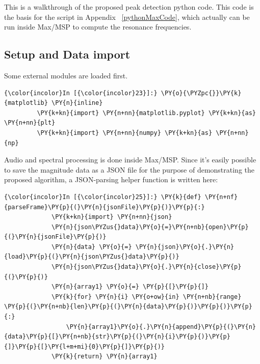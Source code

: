                 
    This is a walkthrough of the proposed peak detection python code. This code is the basis for the script in Appendix ~\ref{pythonMaxCode}, which actually can be run inside Max/MSP to compute the resonance
frequencies.


 \subsection{Setup and Data import}
\label{subsec:setup}
Some external modules are loaded first.

    \begin{Verbatim}[commandchars=\\\{\}]
{\color{incolor}In [{\color{incolor}23}]:} \PY{o}{\PYZpc{}}\PY{k}{matplotlib} \PY{n}{inline}
         \PY{k+kn}{import} \PY{n+nn}{matplotlib.pyplot} \PY{k+kn}{as} \PY{n+nn}{plt}
         \PY{k+kn}{import} \PY{n+nn}{numpy} \PY{k+kn}{as} \PY{n+nn}{np}
\end{Verbatim}




    Audio and spectral processing is done inside Max/MSP. Since it's easily
possible to save the magnitude data as a JSON file for the purpose of
demonstrating the proposed algorithm, a JSON-parsing helper function is
written here:

    \begin{Verbatim}[commandchars=\\\{\}]
{\color{incolor}In [{\color{incolor}25}]:} \PY{k}{def} \PY{n+nf}{parseFrame}\PY{p}{(}\PY{n}{jsonFile}\PY{p}{)}\PY{p}{:}
             \PY{k+kn}{import} \PY{n+nn}{json}
             \PY{n}{json\PYZus{}data}\PY{o}{=}\PY{n+nb}{open}\PY{p}{(}\PY{n}{jsonFile}\PY{p}{)}
             \PY{n}{data} \PY{o}{=} \PY{n}{json}\PY{o}{.}\PY{n}{load}\PY{p}{(}\PY{n}{json\PYZus{}data}\PY{p}{)}
             \PY{n}{json\PYZus{}data}\PY{o}{.}\PY{n}{close}\PY{p}{(}\PY{p}{)}
             \PY{n}{array1} \PY{o}{=} \PY{p}{[}\PY{p}{]}
             \PY{k}{for} \PY{n}{i} \PY{o+ow}{in} \PY{n+nb}{range} \PY{p}{(}\PY{n+nb}{len}\PY{p}{(}\PY{n}{data}\PY{p}{)}\PY{p}{)}\PY{p}{:}
                 \PY{n}{array1}\PY{o}{.}\PY{n}{append}\PY{p}{(}\PY{n}{data}\PY{p}{[}\PY{n+nb}{str}\PY{p}{(}\PY{n}{i}\PY{p}{)}\PY{p}{]}\PY{p}{[}\PY{l+m+mi}{0}\PY{p}{]}\PY{p}{)}
             \PY{k}{return} \PY{n}{array1}
\end{Verbatim}


